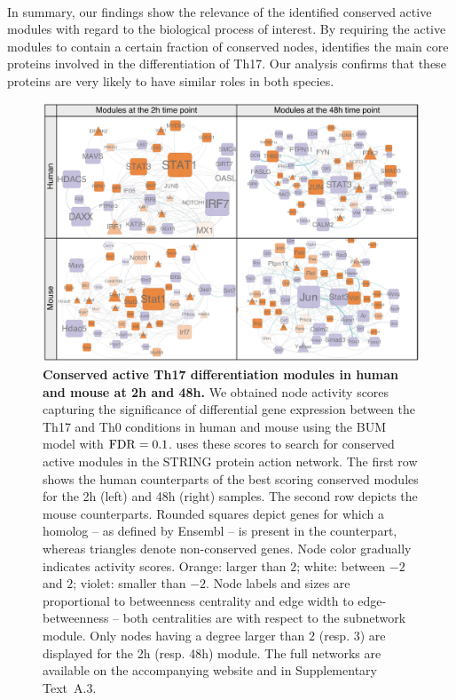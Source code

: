 \paragraph{}
In summary, our findings show the relevance of the identified conserved active modules with regard to the biological process of interest.
By requiring the active modules to contain a certain fraction of conserved nodes, \xheinz{} identifies the main core proteins involved in the differentiation of Th17.
Our analysis confirms that these proteins are very likely to have similar roles in both species.

\begin{figure}[btp]
  \centering
  \includegraphics[width=\linewidth]{img/modules_panel.pdf}
  \caption{\textbf{Conserved active Th17 differentiation modules in human and mouse at \unit{2}{h} and \unit{48}{h}.}
  We obtained node activity scores capturing the significance of differential gene expression between the Th17 and Th0 conditions in human and mouse using the BUM model with $\mathrm{FDR} = 0.1$.
  \xheinz{} uses these scores to search for conserved active modules in the STRING protein action network.
  The first row shows the human counterparts of the best scoring conserved modules for the \unit{2}{h} (left) and \unit{48}{h} (right) samples.
  The second row depicts the mouse counterparts.
  Rounded squares depict genes for which a homolog -- as defined by Ensembl -- is present in the counterpart, whereas triangles denote non-conserved genes.
  Node color gradually indicates activity scores.
  Orange: larger than $2$; white: between $-2$ and $2$; violet: smaller than $-2$.
  Node labels and sizes are proportional to betweenness centrality and edge width to
  edge-betweenness -- both centralities are with respect to the subnetwork module.
  Only nodes having a degree larger than $2$ (resp. $3$) are displayed for the \unit{2}{h} (resp. \unit{48}{h}) module.
  The full networks are available on the accompanying website and in Supplementary Text~A.3.
    }
\label{fig:panel_wht-xheinz_modules}
\end{figure}

